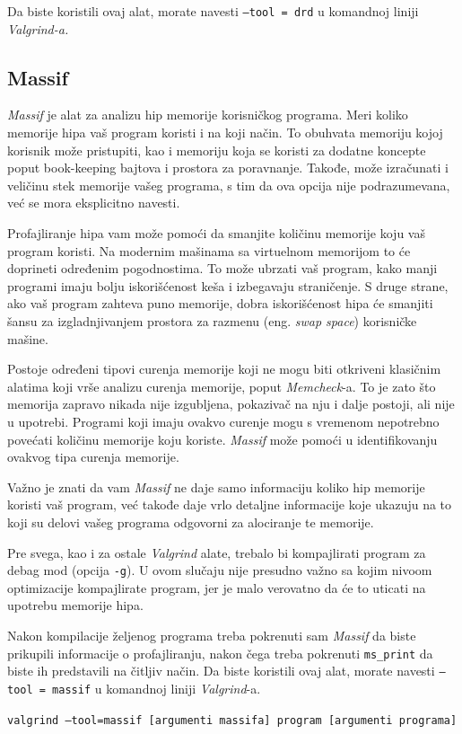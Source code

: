 \documentclass[12pt,oneside]{memoir}
\theoremstyle{plain}
\theoremstyle{definition}
\begin{document}
Da biste koristili ovaj alat, morate navesti \texttt{--tool = drd} u komandnoj liniji \textit{Valgrind-a.}

\subsection{Massif}
\textit{Massif} je alat za analizu hip memorije korisničkog programa. Meri koliko memorije hipa vaš program koristi i na koji način. To obuhvata memoriju kojoj korisnik može pristupiti, kao i memoriju koja se koristi za dodatne koncepte poput book-keeping bajtova i prostora za poravnanje. Takođe, može izračunati i veličinu stek memorije vašeg programa, s tim da ova opcija nije podrazumevana, već se mora eksplicitno navesti.

Profajliranje hipa vam može pomoći da smanjite količinu memorije koju vaš program koristi. Na modernim mašinama sa virtuelnom memorijom to će doprineti određenim pogodnostima. To može ubrzati vaš program, kako manji programi imaju bolju iskorišćenost keša i izbegavaju straničenje. S druge strane, ako vaš program zahteva puno memorije, dobra iskorišćenost hipa će smanjiti šansu za izgladnjivanjem prostora za razmenu (eng. \textit{swap space}) korisničke mašine. 

Postoje određeni tipovi curenja memorije koji ne mogu biti otkriveni klasičnim alatima koji vrše analizu curenja memorije, poput \textit{Memcheck}-a. To je zato što memorija zapravo nikada nije izgubljena, pokazivač na nju i dalje postoji, ali nije u upotrebi. Programi koji imaju ovakvo curenje mogu s vremenom nepotrebno povećati količinu memorije koju koriste. \textit{Massif} može pomoći u identifikovanju ovakvog tipa curenja memorije.

Važno je znati da vam \textit{Massif} ne daje samo informaciju koliko hip memorije koristi vaš program, već takođe daje vrlo detaljne informacije koje ukazuju na to koji su delovi vašeg programa odgovorni za alociranje te memorije.

Pre svega, kao i za ostale \textit{Valgrind} alate, trebalo bi kompajlirati program za debag mod (opcija \texttt{-g}). U ovom slučaju nije presudno važno sa kojim nivoom optimizacije kompajlirate program, jer je malo verovatno da će to uticati na upotrebu memorije hipa.

Nakon kompilacije željenog programa treba pokrenuti sam \textit{Massif} da biste prikupili informacije o profajliranju, nakon čega treba pokrenuti \texttt{ms\_print} da biste ih predstavili na čitljiv način. Da biste koristili ovaj alat, morate navesti \texttt{--tool = massif} u komandnoj liniji \textit{Valgrind}-a.
\begin{center}
\texttt{valgrind --tool=massif [argumenti massifa] program [argumenti programa]}
\end{center}
 
\end{document}

